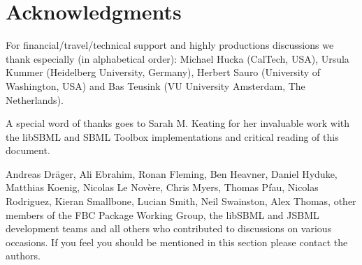 
\section{Acknowledgments}


For financial/travel/technical support and highly productions discussions we thank especially (in alphabetical order): Michael Hucka (CalTech, USA), Ursula Kummer (Heidelberg University, Germany), Herbert Sauro (University of Washington, USA) and Bas Teusink (VU University Amsterdam, The Netherlands).

A special word of thanks goes to Sarah M. Keating for her invaluable work with the \textsf{libSBML} and \textsf{SBML Toolbox} implementations and critical reading of this document.


 Andreas Dr\"{a}ger, Ali Ebrahim, Ronan Fleming, Ben Heavner, Daniel Hyduke, Matthias Koenig, Nicolas Le Nov\`{e}re, Chris Myers, Thomas Pfau, Nicolas Rodriguez, Kieran Smallbone, Lucian Smith, Neil Swainston, Alex Thomas, other members of the \textsf{FBC Package Working Group}, the libSBML and JSBML development teams and all others who contributed to discussions on various occasions. If you feel you should be mentioned in this section please contact the authors.

